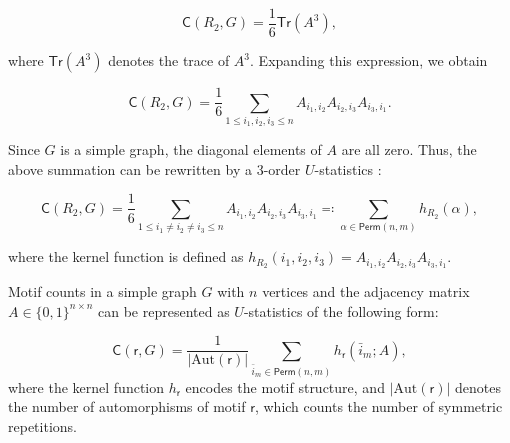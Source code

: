 \documentclass[letterpaper,11pt]{article}
\def\sfr{\mathsf{r}}
\newcommand{\perm}[1]{\mathsf{Perm}(#1)}
\newcommand{\motifrg}[2]{\mathsf{C}(#1,#2)}
\begin{document}
\begin{bibunit}[plainnat]
\begin{equation}
\label{equ:motif_triangle_1}
    \motifrg{R_2}{G} = \frac{1}{6} \mathsf{Tr}(A^3),
\end{equation}

where $\mathsf{Tr}(A^3)$ denotes the trace of $A^3$. Expanding this expression, we obtain

\begin{equation*}
    \motifrg{R_2}{G} = \frac{1}{6} \sum_{1 \le i_1,i_2,i_3 \le n } A_{i_1,i_2} A_{i_2,i_3} A_{i_3,i_1}.
\end{equation*}

Since $G$ is a simple graph, the diagonal elements of $A$ are all zero. Thus, the above summation can be rewritten by a $3$-order $U$-statistics :

\begin{equation*}
    \motifrg{R_2}{G} = \frac{1}{6} \sum_{1 \le i_1 \ne i_2 \ne i_3 \le n } A_{i_1,i_2} A_{i_2,i_3} A_{i_3,i_1}
    \eqqcolon \sum_{ \alpha \in \perm{n,m}} h_{R_2} ( \alpha ),
\end{equation*}

where the kernel function is defined as $h_{R_2}(i_1, i_2, i_3) = A_{i_1,i_2} A_{i_2,i_3} A_{i_3,i_1}$.
\fi

Motif counts in a simple graph $G$ with $n$ vertices and the adjacency matrix $A \in \{0,1\}^{n \times n}$ can be represented as $U$-statistics of the following form:

\begin{equation*}
\motifrg{\sfr}{G} = \frac{1}{|\mathrm{Aut}(\sfr)|} \sum_{ \bar{i}_{m} \in \perm{n,m}} h_{\sfr} (\bar{i}_{m}; A),
\end{equation*}
where the kernel function $h_{\sfr}$ encodes the motif structure, and $|\mathrm{Aut} (\sfr)|$ denotes the number of automorphisms of motif $\sfr$, which counts the number of symmetric repetitions.


\end{bibunit}
\end{document}
